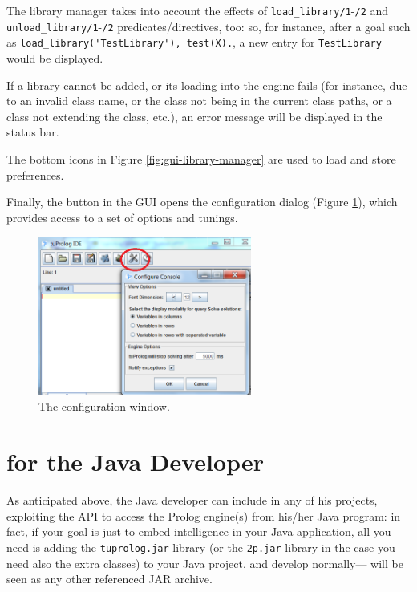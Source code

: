 The library manager takes into account the effects of \verb|load_library/1|-\verb|/2| and \verb|unload_library/1|-\verb|/2| predicates/directives, too: so, for instance, after a goal such as \verb|load_library('TestLibrary'), test(X).|, a new entry for \verb|TestLibrary| would be displayed.

If a library cannot be added, or its loading into the engine fails (for instance, due to an invalid class name, or the class not being in the current class paths, or a class not extending the  class, etc.), an error message will be displayed in the status bar.

The bottom icons in Figure \ref{fig:gui-library-manager} are used to load and store preferences.

\noindent Finally, the  button in the \tuprolog{} GUI opens the configuration dialog (Figure \ref{fig:gui-configuration}), which provides access to a set of options and tunings.

\begin{figure}
\centering
\includegraphics[width=7cm]{images/gui-config}
\caption{The configuration window.}
\label{fig:gui-configuration}
\end{figure}

\section{\tuprolog{} for the Java Developer}
\label{sec:java-user-perspective}

As anticipated above, the Java developer can include \tuprolog{} in any of his projects, exploiting the \tuprolog{} API to access the Prolog engine(s) from his/her Java program: in fact, if your goal is just to embed intelligence in your Java application, all you need is adding the \texttt{tuprolog.jar} library (or the \texttt{2p.jar} library in the case you need also the extra classes) to your Java project, and develop normally---\tuprolog{} will be seen as any other referenced JAR archive.

